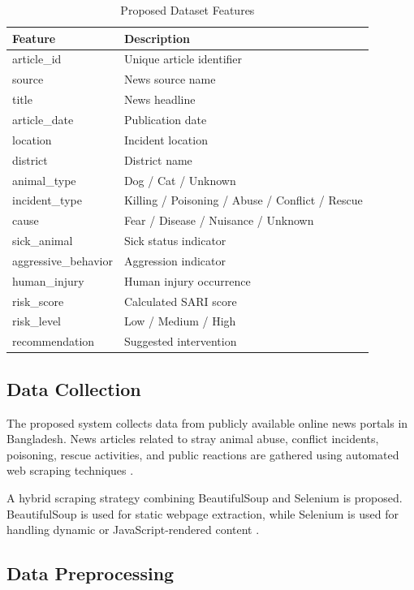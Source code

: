\documentclass[conference]{IEEEtran}
\begin{document}
\begin{table}[h]
\centering
\caption{Proposed Dataset Features}
\begin{tabular}{|p{2.3cm}|p{3.8cm}|}
\hline
\textbf{Feature} & \textbf{Description} \\
\hline
article\_id & Unique article identifier \\
source & News source name \\
title & News headline \\
article\_date & Publication date \\
location & Incident location \\
district & District name \\
animal\_type & Dog / Cat / Unknown \\
incident\_type & Killing / Poisoning / Abuse / Conflict / Rescue \\
cause & Fear / Disease / Nuisance / Unknown \\
sick\_animal & Sick status indicator \\
aggressive\_behavior & Aggression indicator \\
human\_injury & Human injury occurrence \\
risk\_score & Calculated SARI score \\
risk\_level & Low / Medium / High \\
recommendation & Suggested intervention \\
\hline
\end{tabular}
\end{table}

\subsection{Data Collection}

The proposed system collects data from publicly available online news portals in Bangladesh. News articles related to stray animal abuse, conflict incidents, poisoning, rescue activities, and public reactions are gathered using automated web scraping techniques \cite{brown2019,lee2021}.

A hybrid scraping strategy combining BeautifulSoup and Selenium is proposed. BeautifulSoup is used for static webpage extraction, while Selenium is used for handling dynamic or JavaScript-rendered content \cite{brown2019,lee2021,li2021,miller2020}.

\subsection{Data Preprocessing}
\end{document}
